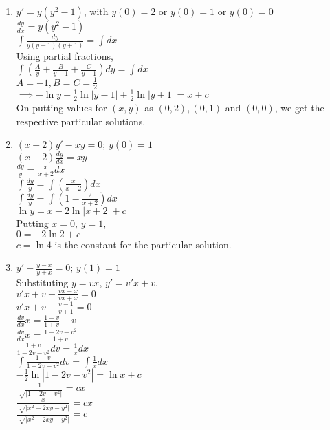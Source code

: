 \documentclass[a4paper]{article}
\begin{document}
\begin{enumerate}
{\begin{enumerate}
{\\$\ln{y}=\ln{\sin x} +c$
\\$y=c\sin x$
\\Putting $x=\frac{\pi}{2}$, $y=1$,
\\$c=1$ is the constant for the particular solution.
}
\item{$y'=y(y^2-1)$, with $y(0)=2$ or $y(0)=1$ or $y(0)=0$
\\$\frac{dy}{dx}=y(y^2-1)$
\\$\int\frac{dy}{y(y-1)(y+1)}=\int dx$
\\Using partial fractions,
\\$\int(\frac{A}{y}+\frac{B}{y-1}+\frac{C}{y+1})dy=\int dx$
\\$A=-1, B=C=\frac{1}{2}$
\\$\implies -\ln{y} + \frac{1}{2}\ln{|y-1|} + \frac{1}{2}\ln{|y+1|}=x+c$
\\On putting values for $(x, y)$ as $(0, 2), (0, 1)$ and $(0, 0)$, we get the respective particular solutions.
}
\item{$(x+2)y'-xy=0$; $y(0)=1$
\\$(x+2)\frac{dy}{dx}=xy$
\\$\frac{dy}{y}=\frac{x}{x+2}dx$
\\$\int\frac{dy}{y}=\int(\frac{x}{x+2})dx$
\\$\int\frac{dy}{y}=\int(1 - \frac{2}{x+2})dx$
\\$\ln y = x - 2\ln|x+2| + c$
\\Putting $x=0$, $y=1$,
\\$0=-2\ln 2 +c$
\\$c=\ln 4$ is the constant for the particular solution.
}
\item{$y'+\frac{y-x}{y+x}=0$; $y(1)=1$
\\Substituting $y=vx$, $y'=v'x + v$,
\\$v'x+v+\frac{vx-x}{vx+x}=0$
\\$v'x+v+\frac{v-1}{v+1}=0$
\\$\frac{dv}{dx}x =\frac{1-v}{1+v}-v$
\\$\frac{dv}{dx}x =\frac{1-2v-v^2}{1+v}$
\\$\frac{1+v}{1-2v-v^2}dv=\frac{1}{x}dx$
\\$\int\frac{1+v}{1-2v-v^2}dv=\int\frac{1}{x}dx$
\\$-\frac{1}{2}\ln|1-2v-v^2|=\ln x +c$
\\$\frac{1}{\sqrt[]{|1-2v-v^2|}}=cx$
\\$\frac{x}{\sqrt[]{|x^2-2xy-y^2|}}=cx$
\\$\frac{}{\sqrt[]{|x^2-2xy-y^2|}}=c$
}
\end{enumerate}}
\end{enumerate}
\end{document}
